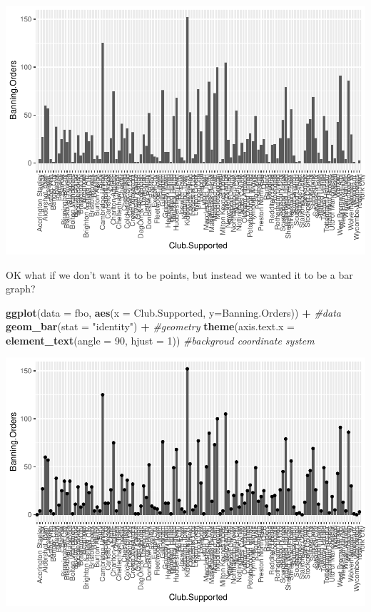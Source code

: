 \documentclass[]{book}
\newenvironment{Shaded}{\begin{snugshade}}{\end{snugshade}}
\newcommand{\CommentTok}[1]{\textcolor[rgb]{0.56,0.35,0.01}{\textit{#1}}}
\newcommand{\DataTypeTok}[1]{\textcolor[rgb]{0.13,0.29,0.53}{#1}}
\newcommand{\DecValTok}[1]{\textcolor[rgb]{0.00,0.00,0.81}{#1}}
\newcommand{\KeywordTok}[1]{\textcolor[rgb]{0.13,0.29,0.53}{\textbf{#1}}}
\newcommand{\NormalTok}[1]{#1}
\newcommand{\OperatorTok}[1]{\textcolor[rgb]{0.81,0.36,0.00}{\textbf{#1}}}
\newcommand{\StringTok}[1]{\textcolor[rgb]{0.31,0.60,0.02}{#1}}
\theoremstyle{definition}
\theoremstyle{definition}
\theoremstyle{definition}
\theoremstyle{remark}
\begin{document}
\includegraphics{03-visualisation_files/figure-latex/unnamed-chunk-6-1.pdf}

OK what if we don't want it to be points, but instead we wanted it to be
a bar graph?

\begin{Shaded}
\begin{Highlighting}[]
\KeywordTok{ggplot}\NormalTok{(}\DataTypeTok{data =}\NormalTok{ fbo, }\KeywordTok{aes}\NormalTok{(}\DataTypeTok{x =}\NormalTok{ Club.Supported, }\DataTypeTok{y=}\NormalTok{Banning.Orders)) }\OperatorTok{+}\StringTok{   }\CommentTok{#data}
\StringTok{   }\KeywordTok{geom_bar}\NormalTok{(}\DataTypeTok{stat =} \StringTok{"identity"}\NormalTok{) }\OperatorTok{+}\StringTok{                                  }\CommentTok{#geometry}
\StringTok{  }\KeywordTok{theme}\NormalTok{(}\DataTypeTok{axis.text.x =} \KeywordTok{element_text}\NormalTok{(}\DataTypeTok{angle =} \DecValTok{90}\NormalTok{, }\DataTypeTok{hjust =} \DecValTok{1}\NormalTok{))                                                       }\CommentTok{#backgroud coordinate system}
\end{Highlighting}
\end{Shaded}

\includegraphics{03-visualisation_files/figure-latex/unnamed-chunk-7-1.pdf}
\end{document}
